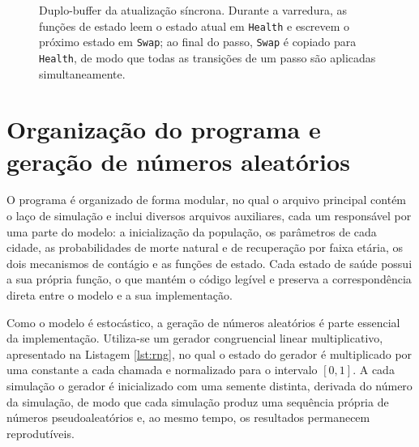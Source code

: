 \documentclass[
	12pt,				%
	openright,			%
	oneside,			%
	a4paper,			%
	english,			%
	french,				%
	spanish,			%
	brazil				%
	]{abntex2}
\begin{document}
\begin{figure}[H]
\centering
{}
\caption{Duplo-buffer da atualização síncrona. Durante a varredura, as funções de estado leem o estado atual em \texttt{Health} e escrevem o próximo estado em \texttt{Swap}; ao final do passo, \texttt{Swap} é copiado para \texttt{Health}, de modo que todas as transições de um passo são aplicadas simultaneamente.}
\label{fig:duplobuffer}
\end{figure}

\section{Organização do programa e geração de números aleatórios}

O programa é organizado de forma modular, no qual o arquivo principal contém o laço de simulação e inclui diversos arquivos auxiliares, cada um responsável por uma parte do modelo: a inicialização da população, os parâmetros de cada cidade, as probabilidades de morte natural e de recuperação por faixa etária, os dois mecanismos de contágio e as funções de estado. Cada estado de saúde possui a sua própria função, o que mantém o código legível e preserva a correspondência direta entre o modelo e a sua implementação.

Como o modelo é estocástico, a geração de números aleatórios é parte essencial da implementação. Utiliza-se um gerador congruencial linear multiplicativo, apresentado na Listagem \ref{lst:rng}, no qual o estado do gerador é multiplicado por uma constante a cada chamada e normalizado para o intervalo $[0,1]$. A cada simulação o gerador é inicializado com uma semente distinta, derivada do número da simulação, de modo que cada simulação produz uma sequência própria de números pseudoaleatórios e, ao mesmo tempo, os resultados permanecem reprodutíveis.
\end{document}
